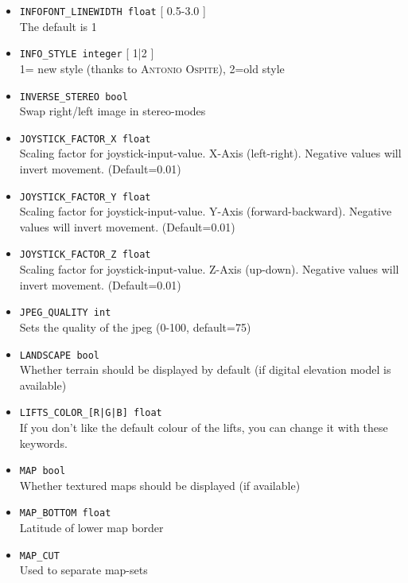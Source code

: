 \begin{itemize}
\item \texttt{INFOFONT\_LINEWIDTH float} [ 0.5-3.0 ] \\
The default is 1

\item \texttt{INFO\_STYLE integer} [ 1|2 ] \\
1= new style (thanks to \textsc{Antonio Ospite}), 2=old style

\item \texttt{INVERSE\_STEREO bool} \\
Swap right/left image in stereo-modes

\item \texttt{JOYSTICK\_FACTOR\_X float} \\
Scaling factor for joystick-input-value. X-Axis (left-right). Negative values will invert movement. (Default=0.01)

\item \texttt{JOYSTICK\_FACTOR\_Y float} \\
Scaling factor for joystick-input-value. Y-Axis (forward-backward). Negative values will invert movement. (Default=0.01)

\item \texttt{JOYSTICK\_FACTOR\_Z float} \\
Scaling factor for joystick-input-value. Z-Axis (up-down). Negative values will invert movement. (Default=0.01)

\item \texttt{JPEG\_QUALITY int} \\
Sets the quality of the jpeg (0-100, default=75)

\item \texttt{LANDSCAPE bool} \\
Whether terrain should be displayed by default (if digital elevation model is available)

\item \texttt{LIFTS\_COLOR\_[R|G|B] float}\\
If you don't like the default colour of the lifts, you can change it with these keywords.

\item \texttt{MAP bool} \\
Whether textured maps should be displayed (if available)

\item \texttt{MAP\_BOTTOM float} \\
Latitude of lower map border

\item \texttt{MAP\_CUT} \\
Used to separate map-sets


\end{itemize}

